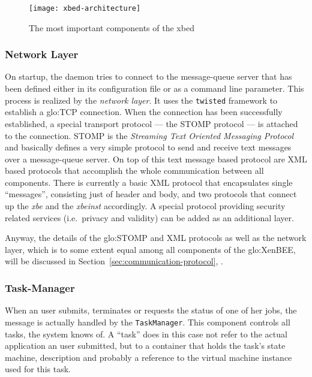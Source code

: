 \begin{figure}[ht]
  \centering
  \texttt{[image: xbed-architecture]}
  \caption[Components of the xbed]{The most important components of the xbed}
  \label{fig:xbed-architecture}
\end{figure}

\subsubsection{Network Layer}

On startup, the  daemon tries to connect to  the message-queue server that
has been  defined either in  its configuration file  or as a  command line
parameter. This process  is realized by the \emph{network  layer}. It uses
the  \texttt{twisted} framework to  establish a  \gls{glo:TCP} connection.
When the connection has been successfully established, a special transport
protocol --- the  STOMP protocol --- is attached  to the connection. STOMP
is  the \emph{Streaming  Text Oriented  Messaging Protocol}  and basically
defines a  very simple protocol to  send and receive text  messages over a
message-queue server.  On top of  this text message based protocol are XML
based  protocols  that  accomplish  the whole  communication  between  all
components.   There is currently  a basic  XML protocol  that encapsulates
single ``messages'', consisting just of header and body, and two protocols
that  connect up  the \emph{xbe}  and the  \emph{xbeinst}  accordingly.  A
special  protocol providing  security related  services  (i.e.~privacy and
validity) can be added as an additional layer.

Anyway, the  details of the \gls{glo:STOMP}  and XML protocols  as well as
the network layer,  which is to some extent equal  among all components of
the        \gls{glo:XenBEE},       will       be        discussed       in
Section~\ref{sec:communication-protocol},
\emph{}.

\subsubsection{Task-Manager}

When an  user submits,  terminates or  requests the status  of one  of her
jobs, the  message is actually handled by  the \texttt{TaskManager}.  This
component controls all tasks, the system knows of. A ``task'' does in this
case  not refer  to the  actual application  an user  submitted, but  to a
container that holds the task's  state machine, description and probably a
reference to the virtual machine instance used for this task.

